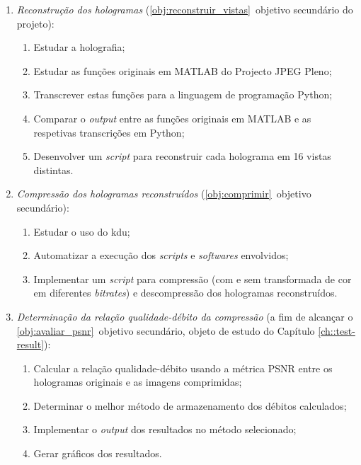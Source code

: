 \begin{enumerate}
    \item \textit{Reconstrução dos hologramas} (\ref{obj:reconstruir_vistas}\textordmasculine~objetivo secundário do projeto):
    \begin{enumerate}
        \item Estudar a holografia;
        \item Estudar as funções originais em MATLAB do Projecto JPEG Pleno;
        \item Transcrever estas funções para a linguagem de programação Python;
        \item Comparar o \textit{output} entre as funções originais em MATLAB e as respetivas transcrições em Python;
        \item Desenvolver um \textit{script} para reconstruir cada holograma em 16 vistas distintas.
    \end{enumerate}

    \item \textit{Compressão dos hologramas reconstruídos} (\ref{obj:comprimir}\textordmasculine~objetivo secundário):
    \begin{enumerate}
        \item Estudar o uso do \ac{kdu};
        \item Automatizar a execução dos \textit{scripts} e \textit{softwares} envolvidos;
        \item Implementar um \textit{script} para compressão (com e sem transformada de cor em diferentes \textit{bitrates}) e descompressão dos hologramas reconstruídos.
    \end{enumerate}

    \item \textit{Determinação da relação qualidade-débito da compressão} (a fim de alcançar o \ref{obj:avaliar_psnr}\textordmasculine~objetivo secundário, objeto de estudo do Capítulo \ref{ch::test-result}):
    \begin{enumerate}
        \item Calcular a relação qualidade-débito usando a métrica \ac{PSNR} entre os hologramas originais e as imagens comprimidas;
        \item Determinar o melhor método de armazenamento dos débitos calculados;
        \item Implementar o \textit{output} dos resultados no método selecionado;
        \item Gerar gráficos dos resultados.
    \end{enumerate}
\end{enumerate}

